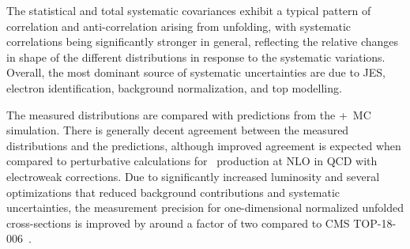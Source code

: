 The statistical and total systematic covariances exhibit a typical pattern of correlation and anti-correlation arising from unfolding, with systematic correlations being significantly stronger in general, reflecting the relative changes in shape of the different distributions in response to the systematic variations.
Overall, the most dominant source of systematic uncertainties are due to JES, electron identification, background normalization, and top \pT modelling.

The measured distributions are compared with predictions from the \Powheg+\Pythia\ MC simulation.
There is generally decent agreement between the measured distributions and the predictions, although improved agreement is expected when compared to perturbative calculations for \ttbar\ production at NLO in QCD with electroweak corrections.
Due to significantly increased luminosity and several optimizations that reduced background contributions and systematic uncertainties, the measurement precision for one-dimensional normalized unfolded cross-sections is improved by around a factor of two compared to CMS TOP-18-006~\cite{Sirunyan:2681777}.

